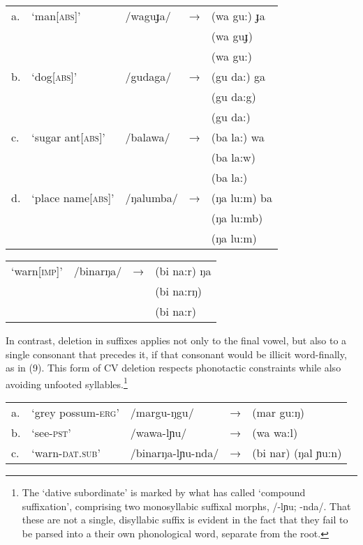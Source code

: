 \documentclass[output=paper,
modfonts
]{LSP/langsci}
\begin{document}
\ea
\begin{tabular}[t]{@{}lllll}
a.  & `man[\textsc{abs}]' & /waguɟa/  & → & (wa gu:) ɟa \\
&&&& \ljudge{*}(wa guɟ)\\
&&&& \ljudge{*}(wa gu:) \\

b. & `dog\textsc{[abs]}' & /gudaga/  & → & (gu da:) ga \\
&&&& \ljudge{*}(gu da:g)\\
&&&& \ljudge{*}(gu da:) \\

c. & `sugar ant[\textsc{abs}]'  & /balawa/  & → & (ba la:) wa \\
&&&& \ljudge{*}(ba la:w) \\
&&&& \ljudge{*}(ba la:) \\

d.  & `place name[\textsc{abs}]' & /ŋalumba/  & → & (ŋa lu:m) ba \\
&&&& \ljudge{*}(ŋa lu:mb)\\
&&&& \ljudge{*}(ŋa lu:m) \\
\end{tabular}

\ex
\begin{tabular}[t]{@{}llll}
`warn[\textsc{imp}]' & /binarŋa/  & → & (bi na:r) ŋa \\
&&& \ljudge{*}(bi na:rŋ)\\
&&& \ljudge{*}(bi na:r) \\
\end{tabular}
\z

\noindent In contrast, deletion in suffixes applies not only to the final vowel, but also to a single consonant that precedes it, if that consonant would be illicit word-finally, as in (9). This form of CV deletion respects phonotactic constraints while also avoiding unfooted syllables.\footnote{The `dative subordinate' is marked by what \citet[26]{round2013} has called `compound suffixation', comprising two monosyllabic suffixal morphs, /-lɲu; -nda/. That these are not a single, disyllabic suffix is evident in the fact that they fail to be parsed into a their own phonological word, separate from the root.}

\ea 
\begin{tabular}[t]{@{}lllll}
a. & `grey possum-\textsc{erg'} & /margu-ŋgu/ & → & (mar gu:ŋ) \\
b. & `see-\textsc{pst'} & /wawa-lɲu/  & → & (wa wa:l) \\
c. & `warn-\textsc{dat.sub'} & /binarŋa-lɲu-nda/  & →  & (bi nar) (ŋal ɲu:n) \\
\end{tabular}
\z
\end{document}

